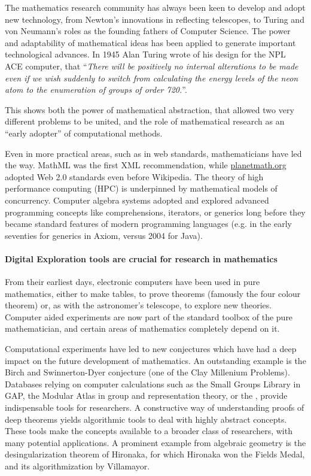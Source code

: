 The mathematics research community has always been keen to develop and
adopt new technology, from Newton's innovations in reflecting
telescopes, to Turing and von Neumann's roles as the founding fathers
of Computer Science. The power and adaptability of mathematical ideas
has been applied to generate important technological advances.  In
1945 Alan Turing wrote of his design for the NPL ACE computer, that
``\emph{There will be positively no internal alterations to be made
  even if we wish suddenly to switch from calculating the energy
  levels of the neon atom to the enumeration of groups of order
  720.}''.

This shows both the power of mathematical abstraction, that allowed
two very different problems to be united, and the role of mathematical
research as an ``early adopter'' of computational methods.

Even in more practical areas, such as in web standards, mathematicians
have led the way. MathML was the first XML recommendation, while
\url{planetmath.org} adopted Web 2.0 standards even before
Wikipedia. The theory of high performance computing (HPC) is
underpinned by mathematical models of concurrency. Computer algebra
systems adopted and explored advanced programming concepts like
comprehensions, iterators, or generics long before they became
standard features of modern programming languages (e.g. in the early
seventies for generics in Axiom, versus 2004 for Java).



\paragraph{Digital Exploration tools are crucial for research in mathematics}

From their earliest days, electronic computers have been used in pure
mathematics, either to make tables, to prove theorems (famously the
four colour theorem) or, as with the astronomer's telescope, to explore
new theories. Computer aided experiments are now part of the standard
toolbox of the pure mathematician, and certain areas of mathematics
completely depend on it.

Computational experiments have led to new conjectures which have had a
deep impact on the future development of mathematics. An outstanding
example is the Birch and Swinnerton-Dyer conjecture (one of the Clay
Millenium Problems).  Databases relying on computer calculations such
as the Small Groups Library in GAP, the Modular Atlas in group and
representation theory, or the \LMFDB, provide indispensable tools for
researchers. A constructive way of understanding proofs of deep
theorems yields algorithmic tools to deal with highly abstract
concepts. These tools make the concepts available to a broader class
of researchers, with many potential applications. A prominent example
from algebraic geometry is the desingularization theorem of Hironaka,
for which Hironaka won the Fields Medal, and its algorithmization by
Villamayor.

